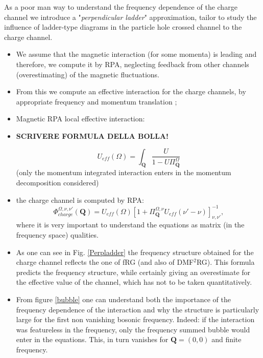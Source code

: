 As a poor man way to understand the frequency dependence of the charge channel we introduce a "\emph{perpendicular ladder}" approximation, tailor to study the influence of ladder-type diagrams in the particle hole crossed channel to the charge channel. 

\begin{itemize}
\item We assume that the magnetic interaction (for some momenta) is leading and therefore, we compute it by RPA, neglecting feedback from other channels (overestimating) of the magnetic fluctuations. 

\item From this we compute an effective interaction for the charge channels, by appropriate frequency and momentum translation ; 

\item Magnetic RPA local effective interaction:

\item \textbf{SCRIVERE FORMULA DELLA BOLLA!}

\begin{equation}
  U_{eff}(\Omega) =\int_{\boldsymbol{Q}} \frac{U}{ 1 - U \Pi^{\Omega}_{\boldsymbol{Q}} }
\end{equation}
(only the momentum integrated interaction enters in the momentum decomposition considered)

\item the charge channel is computed by RPA: 
\begin{equation}
  \Phi_{charge}^{\Omega,\nu,\nu'}(\boldsymbol{Q}) = U_{eff}(\Omega) 
  \left[ 1+  \Pi^{\Omega,\nu}_{\boldsymbol{Q}} U_{eff}(\nu'-\nu) \right]_{\nu,\nu'}^{-1},
\end{equation}
where it is very important to understand the equations as matrix (in the frequency space) qualities. 

\item As one can see in Fig. \ref{Perpladder} the frequency structure obtained for the charge channel reflects the one of fRG (and also of DMF$^2$RG). 
This formula predicts the frequency structure, while certainly giving an overestimate for the effective value of the channel, which has not  to be taken quantitatively. 

\item From figure \ref{bubble} one can understand both the importance of the frequency dependence of the interaction and why the structure is particularly large for the first non vanishing bosonic frequency. 
Indeed: if the interaction was featureless in the frequency, only the frequency summed bubble would enter in the equations. This, in turn vanishes for $\mathbf{Q}=(0,0)$ and finite frequency.  

\end{itemize}

